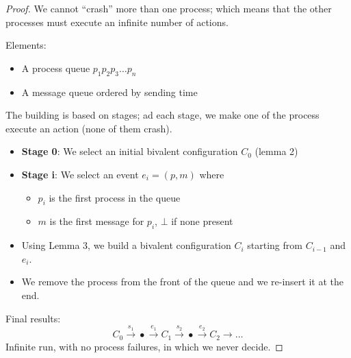 \documentclass[12pt]{article}
\newcommand{\BI}{\begin{itemize}}
\newcommand{\EI}{\end{itemize}}
\begin{document}
\begin{proof}
We cannot ``crash'' more than one process; which means that the other
processes must execute an infinite number of actions.

Elements:
\BI
\item A process queue $p_1 p_2 p_3 \ldots p_n$
\item A message queue ordered by sending time
\EI
The building is based on stages; ad each stage, we make one of the process
execute an action (none of them crash).

\BI
\item {\bf Stage 0}: We select an initial bivalent configuration $C_0$ (lemma 2)
\item {\bf Stage i}: We select an event $e_i = (p, m)$ where 
  \BI
  \item $p_i$ is the first process in the queue
  \item $m$ is the first message for $p_i$, $\bot$ if none present
  \EI
\item Using Lemma 3, we build a bivalent configuration $C_i$ starting
  from $C_{i-1}$ and $e_i$.
\item We remove the process from the front of the queue and we re-insert
  it at the end.
\EI
Final results:
\[
  C_0 \xrightarrow{s_1} \bullet \xrightarrow{e_1} C_1 \xrightarrow{s_2} \bullet \xrightarrow{e_2} C_2 \rightarrow \ldots
\]
Infinite run, with no process failures, in which we never decide.

\end{proof}



 
\end{document}
